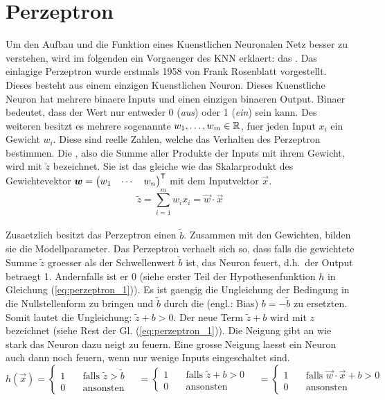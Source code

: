 \section{Perzeptron}
Um den Aufbau und die Funktion eines Kuenstlichen Neuronalen Netz besser zu
verstehen, wird im folgenden ein Vorgaenger des KNN erklaert: das .
\para{}
Das einlagige Perzeptron wurde erstmals 1958 von Frank Rosenblatt vorgestellt. Dieses
besteht aus einem einzigen Kuenstlichen Neuron. Dieses Kuenstliche Neuron
hat mehrere binaere Inputs und einen einzigen binaeren Output. Binaer
bedeutet, dass der Wert nur entweder 0 (\textit{aus}) oder 1 (\textit{ein}) sein
kann. Des weiteren besitzt es mehrere sogenannte  $w_1, \ldots,
w_m \in \mathbb{R}$, fuer jeden Input $x_i$ ein Gewicht $w_i$.
Diese sind reelle Zahlen, welche das Verhalten des Perzeptron bestimmen.
Die , also die Summe aller Produkte der Inputs mit
ihrem Gewicht, wird mit $\tilde{z}$ bezeichnet.
Sie ist das gleiche wie das Skalarprodukt des Gewichtevektor
$\bm{w} = \begin{pmatrix} w_1 & \cdots & w_n \end{pmatrix}^{\mathsf{T}}$ mit dem
Inputvektor $\vec{x}$.
\\
\begin{equation*}
  \tilde{z} = \sum_{i=1}^{m} w_i x_i = \vec{w} \cdot \vec{x}
\end{equation*}
\\
Zusaetzlich besitzt das Perzeptron einen  $\tilde{b}$.
Zusammen mit den Gewichten, bilden sie die Modellparameter.
Das Perzeptron verhaelt sich so, dass falls die gewichtete Summe $\tilde{z}$ groesser als der
Schwellenwert $\tilde{b}$ ist, das Neuron feuert, d.h.\ der Output betraegt 1.
Andernfalls ist er 0 (siehe erster Teil der Hypothesenfunktion $h$ in Gleichung (\ref{eq:perzeptron_1})).
Es ist gaengig die Ungleichung der Bedingung in die Nullstellenform zu bringen
und $\tilde{b}$ durch die  (engl.: Bias)
$b = -\tilde{b}$ zu ersetzten. Somit lautet die Ungleichung: $\tilde{z} + b
> 0$. Der neue Term $\tilde{z} + b$ wird mit $z$ bezeichnet (siehe Rest der Gl. (\ref{eq:perzeptron_1})).
Die Neigung gibt an wie stark das Neuron dazu neigt zu feuern. Eine grosse
Neigung laesst ein Neuron auch dann noch feuern, wenn nur wenige Inputs
eingeschaltet sind.
\\
\begin{equation}\label{eq:perzeptron_1}
  h(\vec{x}) =
  \begin{cases}
    1 & \quad \text{falls } \tilde{z} > \tilde{b}\\
    0 & \quad \text{ansonsten}
  \end{cases}
  \quad =
  \begin{cases}
    1 & \quad \text{falls } \tilde{z} + b > 0\\
    0 & \quad \text{ansonsten}
  \end{cases}
  \quad =
  \begin{cases}
    1 & \quad\text{falls } \vec{w} \cdot \vec{x} + b > 0\\
    0 & \quad\text{ansonsten}
  \end{cases}
\end{equation}

